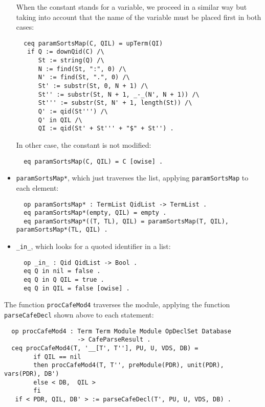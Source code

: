 \begin{itemize}
When the constant stands for a variable, we proceed in a similar way but taking into
account that the name of the variable must be placed first in both cases:

{\codesize
\begin{verbatim}
  ceq paramSortsMap(C, QIL) = upTerm(QI)
   if Q := downQid(C) /\
      St := string(Q) /\
      N := find(St, ":", 0) /\
      N' := find(St, ".", 0) /\
      St' := substr(St, 0, N + 1) /\
      St'' := substr(St, N + 1, _-_(N', N + 1)) /\
      St''' := substr(St, N' + 1, length(St)) /\
      Q' := qid(St''') /\
      Q' in QIL /\
      QI := qid(St' + St''' + "$" + St'') .
\end{verbatim}
}

In other case, the constant is not modified:

{\codesize
\begin{verbatim}
  eq paramSortsMap(C, QIL) = C [owise] .
\end{verbatim}
}

\item
\verb"paramSortsMap*", which just traverses the list, applying
\texttt{paramSortsMap} to each element:

{\codesize
\begin{verbatim}
  op paramSortsMap* : TermList QidList -> TermList .
  eq paramSortsMap*(empty, QIL) = empty .
  eq paramSortsMap*((T, TL), QIL) = paramSortsMap(T, QIL), paramSortsMap*(TL, QIL) .
\end{verbatim}
}

\item
\verb"_in_", which looks for a quoted identifier in a list:

{\codesize
\begin{verbatim}
  op _in_ : Qid QidList -> Bool .
  eq Q in nil = false .
  eq Q in Q QIL = true .
  eq Q in QIL = false [owise] .
\end{verbatim}
}

\end{itemize}

The function \verb"procCafeMod4" traverses the module, applying the function
\verb"parseCafeDecl" shown above to each statement:

{\codesize
\begin{verbatim}
  op procCafeMod4 : Term Term Module Module OpDeclSet Database
                    -> CafeParseResult .
  ceq procCafeMod4(T, '__[T', T''], PU, U, VDS, DB) =
        if QIL == nil
        then procCafeMod4(T, T'', preModule(PDR), unit(PDR), vars(PDR), DB')
        else < DB,  QIL >
        fi
   if < PDR, QIL, DB' > := parseCafeDecl(T', PU, U, VDS, DB) .
\end{verbatim}
}

